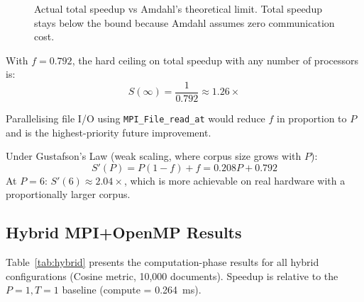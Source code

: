 \documentclass[12pt,a4paper]{article}
\begin{document}
\begin{figure}[!htbp]
\centering
{}
\caption{Actual total speedup vs Amdahl's theoretical limit. Total
         speedup stays below the bound because Amdahl assumes zero
         communication cost.}
\label{fig:amdahl}
\end{figure}

With $f = 0.792$, the hard ceiling on total speedup with any number
of processors is:
\begin{equation}
    S(\infty) = \frac{1}{0.792} \approx 1.26\times
\end{equation}

Parallelising file I/O using \texttt{MPI\_File\_read\_at} would reduce
$f$ in proportion to $P$ and is the highest-priority future
improvement.

Under Gustafson's Law (weak scaling, where corpus size grows with $P$):
\begin{equation}
    S'(P) = P(1-f) + f = 0.208P + 0.792
\end{equation}
At $P = 6$: $S'(6) \approx 2.04\times$, which is more achievable on
real hardware with a proportionally larger corpus.

\subsection{Hybrid MPI+OpenMP Results}
\label{sec:hybrid}

Table~\ref{tab:hybrid} presents the computation-phase results for all
hybrid configurations (Cosine metric, 10,000 documents). Speedup is
relative to the $P=1,T=1$ baseline (compute = 0.264~ms).
\end{document}
